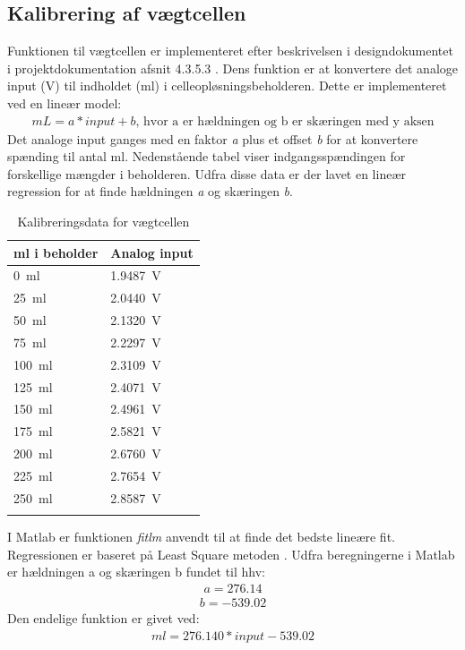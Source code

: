 \subsection{Kalibrering af vægtcellen}
Funktionen til vægtcellen er implementeret efter beskrivelsen i designdokumentet i projektdokumentation afsnit 4.3.5.3 . Dens funktion er at konvertere det analoge input (V) til indholdet (ml) i celleopløsningsbeholderen. Dette er implementeret ved en lineær model:
\begin{align}
mL = a*input+b \text{, hvor a er hældningen og b er skæringen med y aksen}
\end{align}
Det analoge input ganges med en faktor \textit{a} plus et offset \textit{b} for at konvertere spænding til antal ml. Nedenstående tabel viser indgangsspændingen for forskellige mængder i beholderen. Udfra disse data er der lavet en lineær regression for at finde hældningen \textit{a} og skæringen \textit{b}.
\begin{center}
		\begin{longtable}{ | m{3cm} | m{3cm}| } 
			\hline
			\textbf{ml i beholder} &\textbf{Analog input} \\ 
			\hline
			 \SI{0}{\milli\litre} & \SI{1.9487}{\volt} \\ 
			\hline
			 \SI{25}{\milli\litre} & \SI{2.0440}{\volt} \\ 
			\hline
			\SI{50}{\milli\litre} & \SI{2.1320}{\volt} \\ 
			\hline
			\SI{75}{\milli\litre} & \SI{2.2297}{\volt} \\ 
			\hline
			\SI{100}{\milli\litre} & \SI{2.3109}{\volt} \\ 
			\hline
			\SI{125}{\milli\litre} & \SI{2.4071}{\volt} \\ 
			\hline
			\SI{150}{\milli\litre} & \SI{2.4961}{\volt} \\ 
			\hline
			\SI{175}{\milli\litre} & \SI{2.5821}{\volt} \\ 
			\hline
			\SI{200}{\milli\litre} & \SI{2.6760}{\volt} \\ 
			\hline
			\SI{225}{\milli\litre} & \SI{2.7654}{\volt} \\ 
			\hline
			\SI{250}{\milli\litre} & \SI{2.8587}{\volt} \\ 
			\hline
			\caption{Kalibreringsdata for vægtcellen}
			 		\end{longtable}
\end{center}

I Matlab er funktionen \textit{fitlm} anvendt til at finde det bedste lineære fit. Regressionen er baseret på Least Square metoden \citep{least}.
Udfra beregningerne i Matlab er hældningen a og skæringen b fundet til hhv:
\begin{align}
a = 276.14
\end{align}
\begin{align}
b = -539.02
\end{align}
Den endelige funktion er givet ved:
\begin{align}
ml = 276.140*input-539.02
\end{align}

